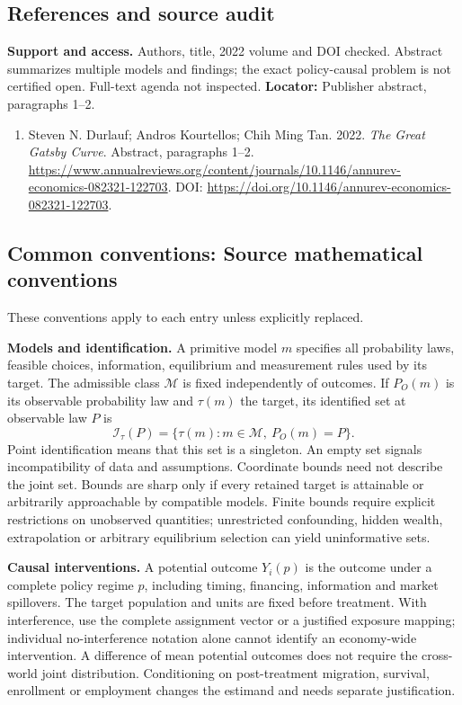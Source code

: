\documentclass[11pt,a4paper]{article}
\begin{document}
\subsection*{References and source audit}
\textbf{Support and access.} Authors, title, 2022 volume and DOI checked. Abstract summarizes multiple models and findings; the exact policy-causal problem is not certified open. Full-text agenda not inspected. \textbf{Locator:} Publisher abstract, paragraphs 1--2.
\begin{enumerate}\raggedright
\item\hypertarget{definitions:source:30007650:1}{} Steven N. Durlauf; Andros Kourtellos; Chih Ming Tan. 2022. \emph{The Great Gatsby Curve}. Abstract, paragraphs 1–2.
\url{https://www.annualreviews.org/content/journals/10.1146/annurev-economics-082321-122703}.
DOI: \url{https://doi.org/10.1146/annurev-economics-082321-122703}.
\end{enumerate}

\subsection*{Common conventions: Source mathematical conventions}

These conventions apply to each entry unless explicitly replaced.

\textbf{Models and identification.} A primitive model \(m\) specifies all probability laws, feasible choices, information, equilibrium and measurement rules used by its target. The admissible class \(\mathcal M\) is fixed independently of outcomes. If \(P_O(m)\) is its observable probability law and \(\tau(m)\) the target, its identified set at observable law \(P\) is
\[
 \mathcal I_\tau(P)=\{\tau(m):m\in\mathcal M,\ P_O(m)=P\}.
\]
Point identification means that this set is a singleton. An empty set signals incompatibility of data and assumptions. Coordinate bounds need not describe the joint set. Bounds are sharp only if every retained target is attainable or arbitrarily approachable by compatible models. Finite bounds require explicit restrictions on unobserved quantities; unrestricted confounding, hidden wealth, extrapolation or arbitrary equilibrium selection can yield uninformative sets.

\textbf{Causal interventions.} A potential outcome \(Y_i(p)\) is the outcome under a complete policy regime \(p\), including timing, financing, information and market spillovers. The target population and units are fixed before treatment. With interference, use the complete assignment vector or a justified exposure mapping; individual no-interference notation alone cannot identify an economy-wide intervention. A difference of mean potential outcomes does not require the cross-world joint distribution. Conditioning on post-treatment migration, survival, enrollment or employment changes the estimand and needs separate justification.
\end{document}
